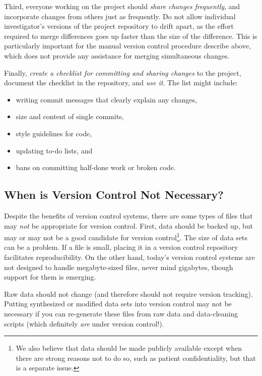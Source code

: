 \documentclass[10pt]{article}
\newcommand{\recommend}[1]{\textit{#1}}
\begin{document}
Third, everyone working on the project should \recommend{share changes
  frequently}, and incorporate changes from others just as
frequently. Do not allow individual investigator's versions of the
project repository to drift apart, as the effort required to merge
differences goes up faster than the size of the difference. This is
particularly important for the manual version control procedure
describe above, which does not provide any assistance for merging
simultaneous changes.

Finally, \recommend{create a checklist for committing and sharing
  changes} to the project, document the checklist in the repository,
and \emph{use it}.  The list might include:

\begin{itemize}
\item
  writing commit messages that clearly explain any changes,
\item
  size and content of single commits,
\item
  style guidelines for code,
\item
  updating to-do lists, and
\item
  bans on committing half-done work or broken code.
\end{itemize}

\subsection*{When is Version Control Not Necessary?}

Despite the benefits of version control systems, there are some types
of files that may \emph{not} be appropriate for version
control. First, data should be backed up, but may or may not be a good
candidate for version control\footnote{We also believe that data
  should be made publicly available except when there are strong
  reasons not to do so, such as patient confidentiality, but that is a
  separate issue.}. The size of data sets can be a problem. If a file
is small, placing it in a version control repository facilitates
reproducibility. On the other hand, today's version control systems
are not designed to handle megabyte-sized files, never mind gigabytes,
though support for them is emerging.

Raw data should not change (and therefore should not require version
tracking). Putting synthesized or modified data sets into version
control may not be necessary if you can re-generate these files from raw
data and data-cleaning scripts (which definitely \emph{are} under
version control!).
\end{document}
